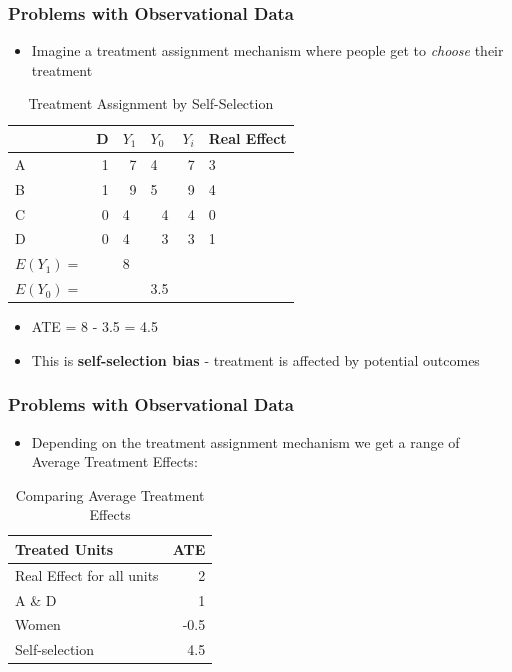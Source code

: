 \documentclass[xcolor=x11names,compress]{beamer}\usepackage[]{graphicx}\usepackage[]{color}
\renewcommand{\(}{\begin{columns}}
\renewcommand{\)}{\end{columns}}
\newcommand{\<}[1]{\begin{column}{#1}}
\renewcommand{\>}{\end{column}}
\begin{document}
\begin{frame}
\frametitle{Problems with Observational Data}
\begin{itemize}
\item Imagine a treatment assignment mechanism where people get to \textit{choose} their treatment
\end{itemize}
\begin{table}[htbp]
  \centering
  \caption{Treatment Assignment by Self-Selection}
    \begin{tabular}{|l|r|l|r|r|l|}
    \hline
          & \multicolumn{1}{l|}{D} & $Y_1$  & \multicolumn{1}{l|}{$Y_0$} & \multicolumn{1}{l|}{$Y_i$} & Real Effect \bigstrut\\
    \hline
    A     & 1     & \multicolumn{1}{r|}{\cellcolor{teal}7} & \multicolumn{1}{l|}{4} & 7     & 3 \bigstrut\\
    \hline
    B     & 1     & \multicolumn{1}{r|}{\cellcolor{teal}9} & \multicolumn{1}{l|}{5} & 9     & 4 \bigstrut\\
    \hline
    C     & 0     & 4     & \cellcolor{teal}4     & 4     & 0 \bigstrut\\
    \hline
    D     & 0     & 4     & \cellcolor{teal}3     & 3     & 1 \bigstrut\\
    \hline \pause
    $E(Y_1)=$ & & 8 & & \bigstrut\\
    \hline
    $E(Y_0)=$ & &  & 3.5 & \bigstrut\\
    \hline
    \end{tabular}%
\end{table}%
\begin{itemize}
\pause
\item ATE = 8 - 3.5 = 4.5
\item This is \textbf{self-selection bias} - treatment is affected by potential outcomes
\end{itemize}
\end{frame}

\begin{frame}
\frametitle{Problems with Observational Data}
\begin{itemize}
\item Depending on the treatment assignment mechanism we get a range of Average Treatment Effects:
\end{itemize}
\begin{table}[htbp]
  \centering
  \caption{Comparing Average Treatment Effects}
    \begin{tabular}{|l|r|}
    \hline
    \textbf{Treated Units} & \multicolumn{1}{l|}{\textbf{ATE}} \bigstrut\\
    \hline
    Real Effect for all units & 2 \bigstrut\\
    \hline
    A \& D & 1 \bigstrut\\
    \hline
    Women & -0.5 \bigstrut\\
    \hline
    Self-selection & 4.5 \bigstrut\\
    \hline
    \end{tabular}%
\end{table}%
\end{frame}
\end{document}

